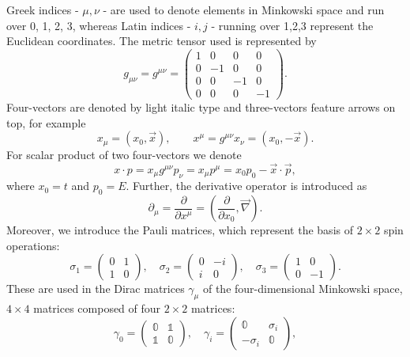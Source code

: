 Greek indices - \eg $\mu, \nu$ - are used to denote elements in Minkowski space and run over 0, 1, 2, 3, whereas Latin indices - \eg $i, j$ - running over 1,2,3 represent the Euclidean coordinates. The metric tensor used is represented by
\begin{equation}
 g_{\mu\nu} = g^{\mu\nu} =
 \begin{pmatrix}
    1 & 0 & 0 & 0\\
    0 & -1 & 0 & 0\\
    0 & 0 & -1 & 0\\
    0 & 0 & 0 & -1
  \end{pmatrix}.
\end{equation}
Four-vectors are denoted by light italic type and three-vectors feature arrows on top, for example
\begin{equation}
 x_{\mu} = \left(x_0,\vec{x}\right), \qquad x^{\mu} = g^{\mu\nu}x_{\nu} = \left(x_0,-\vec{x}\right).
\end{equation}
For scalar product of two four-vectors we denote
\begin{equation}
 x \cdot p = x_{\mu}g^{\mu\nu}p_{\nu} = x_{\mu}p^{\mu} = x_0p_0 - \vec{x}\cdot \vec{p},
\end{equation}
where $x_0 = t$ and $p_0 = E$. Further, the derivative operator is introduced as
\begin{equation}
 \partial_{\mu} = \frac{\partial}{\partial x^\mu} = \left( \frac{\partial}{\partial x_0},\vec{\nabla}\right). 
\end{equation}
Moreover, we introduce the Pauli matrices, which represent the basis of $2\times2$ spin operations:
\begin{equation}
    \sigma_1 = \begin{pmatrix}
        0 & 1 \\
        1 & 0
    \end{pmatrix}, \quad
    \sigma_2 = \begin{pmatrix}
        0 & -i \\
        i & 0
    \end{pmatrix}, \quad
    \sigma_3 = \begin{pmatrix}
        1 & 0 \\
        0 & -1
    \end{pmatrix}.
\end{equation}
These are used in the Dirac matrices $\gamma_{\mu}$ of the four-dimensional Minkowski space, \ie $4\times4$ matrices composed of four $2\times2$ matrices:
\begin{equation} \label{eq:GammaMatrices}
    \gamma_0 = \begin{pmatrix}
        \mathbb{0} & \mathbb{1} \\
        \mathbb{1} & \mathbb{0}
    \end{pmatrix}, \quad
    \gamma_i = \begin{pmatrix}
        \mathbb{0} & \sigma_i \\
        -\sigma_i & \mathbb{0}
    \end{pmatrix},
\end{equation}
